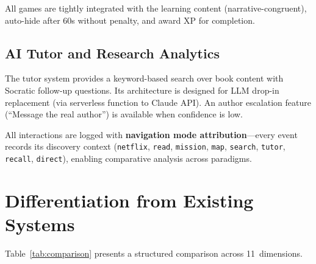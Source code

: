 \documentclass[11pt,a4paper]{article}
\begin{document}
All games are tightly integrated with the learning content (narrative-congruent), auto-hide after 60s without penalty, and award XP for completion.

\subsection{AI Tutor and Research Analytics}

The tutor system provides a keyword-based search over book content with Socratic follow-up questions. Its architecture is designed for LLM drop-in replacement (via serverless function to Claude API). An author escalation feature (``Message the real author'') is available when confidence is low.

All interactions are logged with \textbf{navigation mode attribution}---every event records its discovery context (\texttt{netflix}, \texttt{read}, \texttt{mission}, \texttt{map}, \texttt{search}, \texttt{tutor}, \texttt{recall}, \texttt{direct}), enabling comparative analysis across paradigms.

\section{Differentiation from Existing Systems}\label{sec:diff}

Table~\ref{tab:comparison} presents a structured comparison across 11~dimensions.
\end{document}
